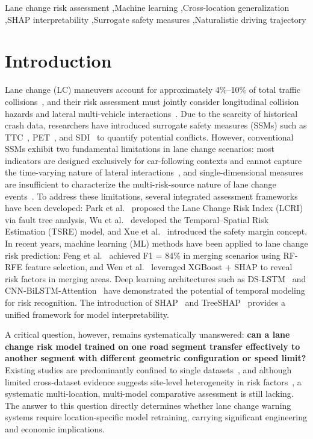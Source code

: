 \documentclass[preprint,review,12pt,a4paper]{elsarticle}
\begin{document}
\begin{frontmatter}
\begin{keyword}
Lane change risk assessment \sep Machine learning \sep Cross-location generalization \sep SHAP interpretability \sep Surrogate safety measures \sep Naturalistic driving trajectory
\end{keyword}

\end{frontmatter}

\section{Introduction}

Lane change (LC) maneuvers account for approximately 4\%--10\% of total traffic collisions~\cite{C01,C02}, and their risk assessment must jointly consider longitudinal collision hazards and lateral multi-vehicle interactions~\cite{C03}. Due to the scarcity of historical crash data, researchers have introduced surrogate safety measures (SSMs) such as TTC~\cite{C05}, PET~\cite{C04}, and SDI~\cite{C06} to quantify potential conflicts. However, conventional SSMs exhibit two fundamental limitations in lane change scenarios: most indicators are designed exclusively for car-following contexts and cannot capture the time-varying nature of lateral interactions~\cite{C03,C07}, and single-dimensional measures are insufficient to characterize the multi-risk-source nature of lane change events~\cite{C01}. To address these limitations, several integrated assessment frameworks have been developed: Park et al.~\cite{C08} proposed the Lane Change Risk Index (LCRI) via fault tree analysis, Wu et al.~\cite{C03} developed the Temporal--Spatial Risk Estimation (TSRE) model, and Xue et al.~\cite{C02} introduced the safety margin concept. In recent years, machine learning (ML) methods have been applied to lane change risk prediction: Feng et al.~\cite{C09} achieved F1 = 84\% in merging scenarios using RF-RFE feature selection, and Wen et al.~\cite{C10} leveraged XGBoost + SHAP to reveal risk factors in merging areas. Deep learning architectures such as DS-LSTM~\cite{C11} and CNN-BiLSTM-Attention~\cite{C12} have demonstrated the potential of temporal modeling for risk recognition. The introduction of SHAP~\cite{C13} and TreeSHAP~\cite{C14} provides a unified framework for model interpretability.

A critical question, however, remains systematically unanswered: \textbf{can a lane change risk model trained on one road segment transfer effectively to another segment with different geometric configuration or speed limit?} Existing studies are predominantly confined to single datasets~\cite{C15}, and although limited cross-dataset evidence suggests site-level heterogeneity in risk factors~\cite{C16}, a systematic multi-location, multi-model comparative assessment is still lacking. The answer to this question directly determines whether lane change warning systems require location-specific model retraining, carrying significant engineering and economic implications.
\end{document}

